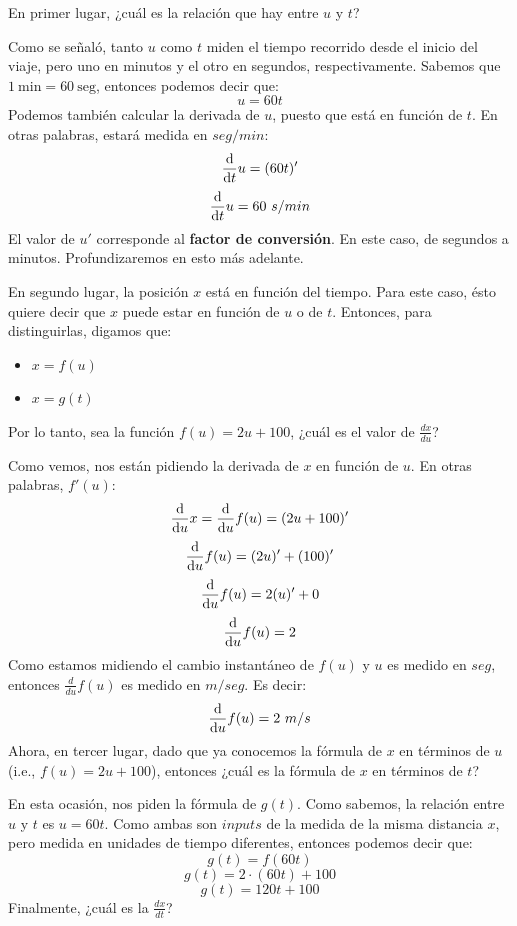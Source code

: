 \documentclass[12pt]{article}
\begin{document}
En primer lugar, ¿cuál es la relación que hay entre $u$ y $t$?

Como se señaló, tanto $u$ como $t$ miden el tiempo recorrido desde el inicio del viaje, pero uno en minutos y el otro en segundos, respectivamente. Sabemos que $1 \ \mathrm{min} = 60 \ \mathrm{seg}$, entonces podemos decir que:
\[u = 60t\]
Podemos también calcular la derivada de $u$, puesto que está en función de $t$. En otras palabras, estará medida en $seg/min$:
\[\diff*{u}t = (60t)'\]
\[\diff*{u}t = 60 \ s/min\]
El valor de $u'$ corresponde al \textbf{factor de conversión}. En este caso, de segundos a minutos. Profundizaremos en esto más adelante.

En segundo lugar, la posición $x$ está en función del tiempo. Para este caso, ésto quiere decir que $x$ puede estar en función de $u$ o de $t$. Entonces, para distinguirlas, digamos que:

\begin{itemize}
\item $x = f(u)$
\item $x = g(t)$
\end{itemize}

Por lo tanto, sea la función $f(u) = 2u + 100$, ¿cuál es el valor de $\frac{dx}{du}$?

Como vemos, nos están pidiendo la derivada de $x$ en función de $u$. En otras palabras, $f'(u)$:
\[\diff*{x}u = \diff*{f(u)}u = (2u + 100)'\]
\[\diff*{f(u)}u = (2u)' + (100)'\]
\[\diff*{f(u)}u = 2(u)' + 0\]
\[\diff*{f(u)}u = 2\]
Como estamos midiendo el cambio instantáneo de $f(u)$ y $u$ es medido en $seg$, entonces $\frac{d}{du}f(u)$ es medido en $m/seg$. Es decir:
\[\diff*{f(u)}u = 2 \ m/s\]
Ahora, en tercer lugar, dado que ya conocemos la fórmula de $x$ en términos de $u$ (i.e., $f(u) = 2u + 100$), entonces ¿cuál es la fórmula de $x$ en términos de $t$?

En esta ocasión, nos piden la fórmula de $g(t)$. Como sabemos, la relación entre $u$ y $t$ es $u = 60t$. Como ambas son $inputs$ de la medida de la misma distancia $x$, pero medida en unidades de tiempo diferentes, entonces podemos decir que:
\[g(t) = f(60t)\]
\[g(t) = 2 \cdot (60t) + 100\]
\[g(t) = 120t + 100\]
Finalmente, ¿cuál es la $\frac{dx}{dt}$?
\end{document}
